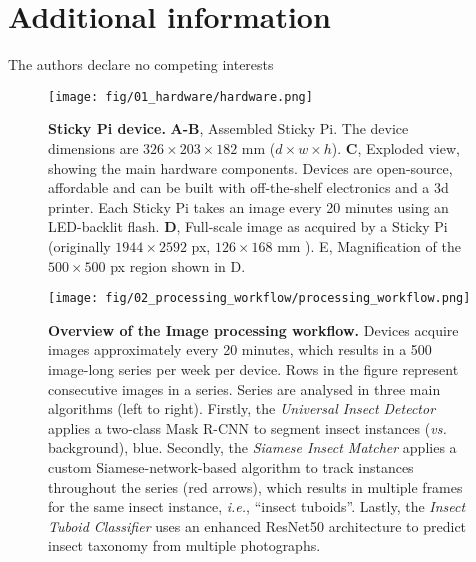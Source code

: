 \documentclass[fleqn,10pt]{wlscirep}
\begin{document}
\section*{Additional information}
The authors declare no competing interests


\pagebreak
\begin{figure}[ht]
\centering
\texttt{[image: fig/01\_hardware/hardware.png]}
\caption{\textbf{Sticky Pi device.} \textbf{A-B}, Assembled Sticky Pi. The device dimensions are $326 \times{} 203 \times{} 182$ mm ($d \times{} w \times{} h$). \textbf{C}, Exploded view, showing the main hardware components. Devices are open-source, affordable and can be built with off-the-shelf electronics and a 3d printer. Each Sticky Pi takes an image every 20 minutes using an LED-backlit flash. \textbf{D}, Full-scale image as acquired by a Sticky Pi (originally $1944 \times{} 2592$ px, $126 \times{} 168$ mm ). E, Magnification of the $500 \times{} 500$ px region shown in D.}
\label{fig:01}
\end{figure}
\pagebreak

\begin{figure}[ht]
	\centering
	\texttt{[image: fig/02\_processing\_workflow/processing\_workflow.png]}
	\caption{\textbf{Overview of the Image processing workflow.} Devices acquire images approximately every 20 minutes, which results in a 500 image-long series per week per device. Rows in the figure represent consecutive images in a series. Series are analysed in three main algorithms (left to right). Firstly, the \emph{Universal Insect Detector} applies a two-class Mask R-CNN to segment insect instances (\emph{vs.} background), blue. Secondly, the \emph{Siamese Insect Matcher} applies a custom Siamese-network-based algorithm to track instances throughout the series (red arrows), which results in multiple frames for the same insect instance, \emph{i.e.}, “insect tuboids”. Lastly, the \emph{Insect Tuboid Classifier} uses an enhanced ResNet50 architecture to predict insect taxonomy from multiple photographs.}
	\label{fig:02}
\end{figure}

\pagebreak
\end{document}
